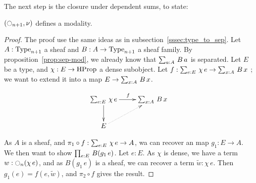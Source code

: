 The next step is the closure under dependent sums, to state:
\begin{prop}
  $(\ocircle_{n+1},\nu)$ defines a modality.
\end{prop}
\begin{proof}
  The proof use the same ideas as in
  subsection~\ref{sssec:type_to_sep}. Let $A:\operatorname{Type}_{n+1}$ a sheaf and
  $B:A\to\operatorname{Type}_{n+1}$ a sheaf family. By
  proposition~\ref{prop:sep-mod}, we already know that $\sum_{a:A}\, B\,
    a$ is separated. Let $E$ be a type, and $\chi:E\to \operatorname{HProp}$ a
  dense subobject. Let $f:\sum_{e:E}\, \chi\, e \to \sum_{x:A}\, B\, x$
  ; we want to extend it into a map $E\to \sum_{x:A}\, B\, x$.

  \[
    \xymatrix{
      \sumD e E {\chi\, e} \ar[r]^f \ar[d] & \sumD x A {B\, x} \\
      E \ar@{.>}[ru]&
    }
  \]

  As $A$ is a sheaf, and $\pi_1\circ f:\sum_{e:E}\, \chi\, e
  \to A$, wa can recover an map $g_1:E \to A$. We then want to show
  $\prod_{e:E}\, B(g_1\, e)$. Let $e:E$. As $\chi$ is dense, we have a
  term $w:\ocircle_n(\chi\, e)$, and as $B(g_1\, e)$ is a sheaf, we can
  recover a term $\widetilde w:\chi\, e$. Then $g_1(e) =
  f(e,\widetilde w)$, and $\pi_2\circ f$ gives the result.
\end{proof}

